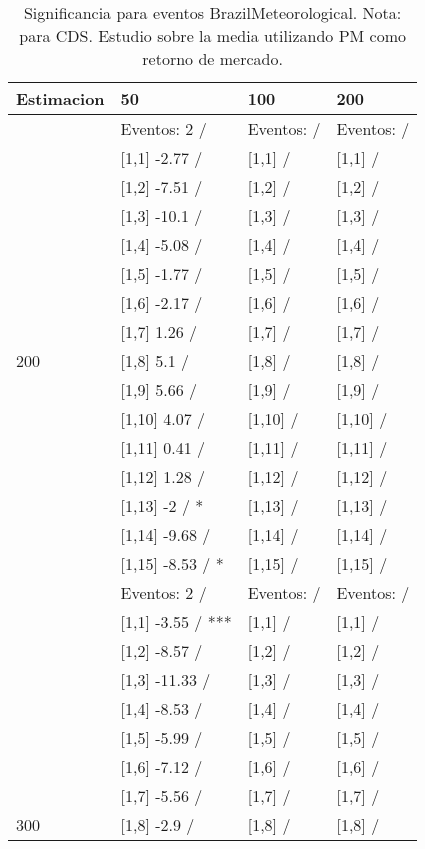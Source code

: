 \begin{table}

\caption{Significancia para eventos BrazilMeteorological. Nota: para CDS. Estudio sobre la media utilizando PM como retorno de mercado.}
\centering
\begin{tabular}[t]{llll}
\toprule
Estimacion & 50 & 100 & 200\\
\midrule
 & Eventos:  2 / & Eventos:   / & Eventos:   /\\
 & {}[1,1] -2.77  / & {}[1,1]  / & {}[1,1]  /\\
 & {}[1,2] -7.51  / & {}[1,2]  / & {}[1,2]  /\\
 & {}[1,3] -10.1  / & {}[1,3]  / & {}[1,3]  /\\
 & {}[1,4] -5.08  / & {}[1,4]  / & {}[1,4]  /\\
\addlinespace
 & {}[1,5] -1.77  / & {}[1,5]  / & {}[1,5]  /\\
 & {}[1,6] -2.17  / & {}[1,6]  / & {}[1,6]  /\\
 & {}[1,7] 1.26  / & {}[1,7]  / & {}[1,7]  /\\
200 & {}[1,8] 5.1  / & {}[1,8]  / & {}[1,8]  /\\
 & {}[1,9] 5.66  / & {}[1,9]  / & {}[1,9]  /\\
\addlinespace
 & {}[1,10] 4.07  / & {}[1,10]  / & {}[1,10]  /\\
 & {}[1,11] 0.41  / & {}[1,11]  / & {}[1,11]  /\\
 & {}[1,12] 1.28  / & {}[1,12]  / & {}[1,12]  /\\
 & {}[1,13] -2  / * & {}[1,13]  / & {}[1,13]  /\\
 & {}[1,14] -9.68  / & {}[1,14]  / & {}[1,14]  /\\
\addlinespace
 & {}[1,15] -8.53  / * & {}[1,15]  / & {}[1,15]  /\\
 & Eventos:  2 / & Eventos:   / & Eventos:   /\\
 & {}[1,1] -3.55  / *** & {}[1,1]  / & {}[1,1]  /\\
 & {}[1,2] -8.57  / & {}[1,2]  / & {}[1,2]  /\\
 & {}[1,3] -11.33  / & {}[1,3]  / & {}[1,3]  /\\
\addlinespace
 & {}[1,4] -8.53  / & {}[1,4]  / & {}[1,4]  /\\
 & {}[1,5] -5.99  / & {}[1,5]  / & {}[1,5]  /\\
 & {}[1,6] -7.12  / & {}[1,6]  / & {}[1,6]  /\\
 & {}[1,7] -5.56  / & {}[1,7]  / & {}[1,7]  /\\
300 & {}[1,8] -2.9  / & {}[1,8]  / & {}[1,8]  /\\

\end{tabular}
\end{table}
